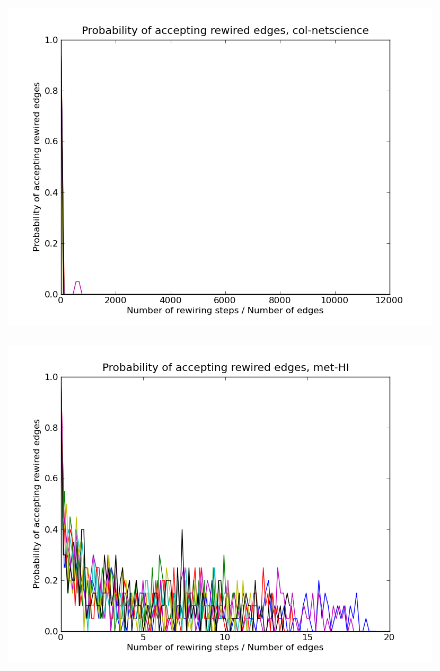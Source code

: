 \documentclass[12pt]{article}
\begin{document}
\begin{figure}[p]
\includegraphics[scale=0.75]{Paccept-col-netscience.png}\\
\end{figure}


\begin{figure}[p]
\includegraphics[scale=0.75]{Paccept-met-HI.png}\\
\end{figure}
\end{document}
